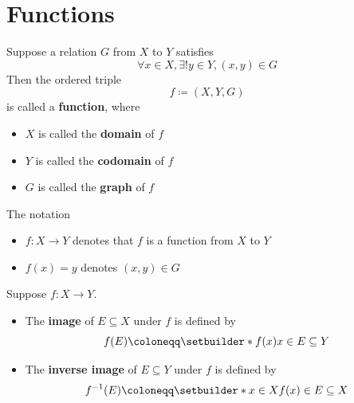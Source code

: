 \section{Functions}

\begin{definition} \label{an:def:function}
  Suppose a relation $G$ from $X$ to $Y$ satisfies
  \[
    \forall x \in X, \exists! y \in Y, (x, y) \in G
  \]
  Then the ordered triple
  \[
    f \coloneqq (X, Y, G)
  \]
  is called a \textbf{function}, where
  \begin{itemize}
    \item $X$ is called the \textbf{domain} of $f$
    \item $Y$ is called the \textbf{codomain} of $f$
    \item $G$ is called the \textbf{graph} of $f$
  \end{itemize}
  The notation
  \begin{itemize}
    \item $f:X \to Y$ denotes that $f$ is a function from $X$ to $Y$
    \item $f(x) = y$ denotes $(x, y)\in G$
  \end{itemize}
\end{definition}

\bigskip

\begin{definition} \label{an:def:image-inverse-image}
  Suppose $f: X \to Y$.
  \begin{itemize}
    \item The \textbf{image} of $E \subseteq X$ under $f$ is defined by
          \[
            f(E) \coloneqq \setbuilder*{f(x)}{x \in E} \subseteq Y
          \]
    \item The \textbf{inverse image} of $E \subseteq Y$ under $f$ is defined by
          \[
            f^{-1}(E) \coloneqq \setbuilder*{x \in X}{f(x) \in E} \subseteq X
          \]
  \end{itemize}
\end{definition}

\bigskip

